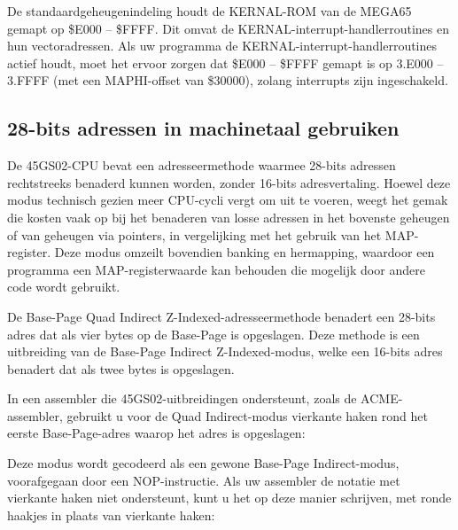 De standaardgeheugenindeling houdt de KERNAL-ROM van de MEGA65 gemapt op \$E000 -- \$FFFF. Dit omvat de KERNAL-interrupt-handlerroutines en hun vectoradressen. Als uw programma de KERNAL-interrupt-handlerroutines actief houdt, moet het ervoor zorgen dat \$E000 -- \$FFFF gemapt is op 3.E000 -- 3.FFFF (met een MAPHI-offset van \$30000), zolang interrupts zijn ingeschakeld.

\subsection{28-bits adressen in machinetaal gebruiken}

De 45GS02-CPU bevat een adresseermethode waarmee 28-bits adressen rechtstreeks benaderd kunnen worden, zonder 16-bits adresvertaling. Hoewel deze modus technisch gezien meer CPU-cycli vergt om uit te voeren, weegt het gemak die kosten vaak op bij het benaderen van losse adressen in het bovenste geheugen of van geheugen via pointers, in vergelijking met het gebruik van het MAP-register. Deze modus omzeilt bovendien banking en hermapping, waardoor een programma een MAP-registerwaarde kan behouden die mogelijk door andere code wordt gebruikt.

De Base-Page Quad Indirect Z-Indexed-adresseermethode benadert een 28-bits adres dat als vier bytes op de Base-Page is opgeslagen. Deze methode is een uitbreiding van de Base-Page Indirect Z-Indexed-modus, welke een 16-bits adres benadert dat als twee bytes is opgeslagen.

In een assembler die 45GS02-uitbreidingen ondersteunt, zoals de ACME-assembler, gebruikt u voor de Quad Indirect-modus vierkante haken rond het eerste Base-Page-adres waarop het adres is opgeslagen:


Deze modus wordt gecodeerd als een gewone Base-Page Indirect-modus, voorafgegaan door een NOP-instructie. Als uw assembler de notatie met vierkante haken niet ondersteunt, kunt u het op deze manier schrijven, met ronde haakjes in plaats van vierkante haken:

